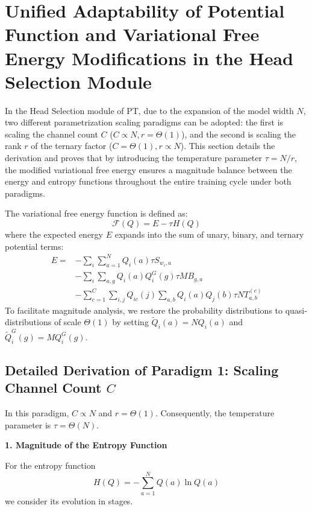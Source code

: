 \documentclass[11pt]{article}
\begin{document}
\section{Unified Adaptability of Potential Function and Variational Free Energy Modifications in the Head Selection Module}
\label{app:B}

In the Head Selection module of PT, due to the expansion of the model width $N$, two different parametrization scaling paradigms can be adopted: the first is scaling the channel count $C$ ($C \propto N, r = \Theta(1)$), and the second is scaling the rank $r$ of the ternary factor ($C = \Theta(1), r \propto N$). This section details the derivation and proves that by introducing the temperature parameter $\tau = N/r$, the modified variational free energy ensures a magnitude balance between the energy and entropy functions throughout the entire training cycle under both paradigms.

The variational free energy function is defined as:
\begin{equation}
\mathcal{F}(Q) = E - \tau H(Q)
\end{equation}
where the expected energy $E$ expands into the sum of unary, binary, and ternary potential terms:
\begin{equation}
\begin{split}
E = &-\sum_i \sum_{a=1}^N Q_i(a) \tau S_{w_i,a} \\
    &-\sum_{i} \sum_{a,g} Q_i(a) Q_i^G(g) \tau M B_{g,a} \\
    &-\sum_{c=1}^C \sum_{i,j} Q_{ic}(j) \sum_{a,b} Q_i(a) Q_j(b) \tau N T_{a,b}^{(c)}
\end{split}
\end{equation}
To facilitate magnitude analysis, we restore the probability distributions to quasi-distributions of scale $\Theta(1)$ by setting $\tilde{Q}_i(a) = N Q_i(a)$ and $\tilde{Q}_i^G(g) = M Q_i^G(g)$.


\subsection{Detailed Derivation of Paradigm 1: Scaling Channel Count $C$}

In this paradigm, $C \propto N$ and $r = \Theta(1)$. Consequently, the temperature parameter is $\tau = \Theta(N)$.

\textbf{1. Magnitude of the Entropy Function}

For the entropy function 
\begin{equation}
    H(Q) = -\sum_{a=1}^N Q(a) \ln Q(a)
\end{equation}
we consider its evolution in stages.
\end{document}

